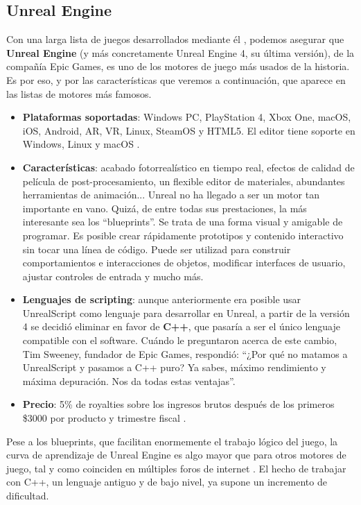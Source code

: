 \subsection{Unreal Engine}
Con una larga lista de juegos desarrollados mediante él \cite{wiki:unrealgames}, podemos asegurar que \textbf{Unreal Engine} (y más concretamente Unreal Engine 4, su última versión), de la compañía Epic Games, es uno de los motores de juego más usados de la historia. Es por eso, y por las características que veremos a continuación, que aparece en las listas de motores más famosos.
\begin{itemize}
\item \textbf{Plataformas soportadas}: Windows PC, PlayStation 4, Xbox One, macOS, iOS, Android, AR, VR, Linux, SteamOS y HTML5. El editor tiene soporte en Windows, Linux y macOS \cite{eulaunreal}.
\item \textbf{Características}: acabado fotorrealístico en tiempo real, efectos de calidad de película de post-procesamiento, un flexible editor de materiales, abundantes herramientas de animación...\cite{unrealfeatures} Unreal no ha llegado a ser un motor tan importante en vano. Quizá, de entre todas sus prestaciones, la más interesante sea los ``blueprints''. Se trata de una forma visual y amigable de programar. Es posible crear rápidamente prototipos y contenido interactivo sin tocar una línea de código. Puede ser utilizad para construir comportamientos e interacciones de objetos, modificar interfaces de usuario, ajustar controles de entrada y mucho más.
\item \textbf{Lenguajes de scripting}: aunque anteriormente era posible usar UnrealScript como lenguaje para desarrollar en Unreal, a partir de la versión 4 se decidió eliminar en favor de \textbf{C++}, que pasaría a ser el único lenguaje compatible con el software. Cuándo le preguntaron acerca de este cambio, Tim Sweeney, fundador de Epic Games, respondió: ``¿Por qué no matamos a UnrealScript y pasamos a C++ puro? Ya sabes, máximo rendimiento y máxima depuración. Nos da todas estas ventajas''\cite{removeuscript}.
\item \textbf{Precio}: 5\% de royalties sobre los ingresos brutos después de los primeros \$3000 por producto y trimestre fiscal \cite{eulaunreal}.
\end{itemize}

Pese a los blueprints, que facilitan enormemente el trabajo lógico del juego, la curva de aprendizaje de Unreal Engine es algo mayor que para otros motores de juego, tal y como coinciden en múltiples foros de internet \cite{curveunreal}. El hecho de trabajar con C++, un lenguaje antiguo y de bajo nivel, ya supone un incremento de dificultad.

